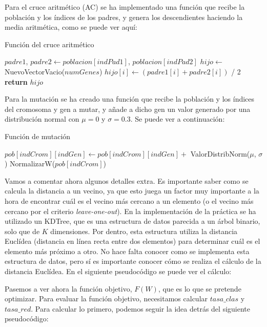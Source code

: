 \documentclass[11pt,a4paper]{article}
\begin{document}
Para el cruce aritmético (AC) se ha implementado una función que recibe la población y los índices de los padres, y genera
los descendientes haciendo la media aritmética, como se puede ver aquí:

\begin{algorithm}[H]
\caption{Función del cruce aritmético}
\begin{algorithmic}[1]
\State $padre1$, $padre2 \gets poblacion[indPad1]$, $poblacion[indPad2]$
\State $hijo \gets$ NuevoVectorVacio($numGenes$)
	\State $hijo[i] \gets (padre1[i] + padre2[i])$ / 2
\EndFor
\State \textbf{return} $hijo$
\EndFunction
\end{algorithmic}
\end{algorithm}

Para la mutación se ha creado una función que recibe la población y los índices del cromosoma y gen a mutar, y añade a dicho
gen un valor generado por una distribución normal con $\mu = 0$ y $\sigma = 0.3$. Se puede ver a continuación:

\begin{algorithm}[H]
\caption{Función de mutación}
\begin{algorithmic}[1]
\State $pob[indCrom][indGen] \gets pob[indCrom][indGen] + $ ValorDistribNorm($\mu$, $\sigma$)
\State NormalizarW($pob[indCrom]$)
\EndFunction
\end{algorithmic}
\end{algorithm}

Vamos a comentar ahora algunos detalles extra. Es importante saber como se calcula la distancia a un vecino, ya que esto juega
un factor muy importante a la hora de encontrar cuál es el vecino más cercano a un elemento (o el vecino más cercano por el
criterio \textit{leave-one-out}). En la implementación de la práctica se ha utilizado un KDTree, que es una estructura de datos
parecida a un árbol binario, solo que de $K$ dimensiones. Por dentro, esta estructura utiliza la distancia Euclídea (distancia
en línea recta entre dos elementos) para determinar cuál es el elemento más próximo a otro. No hace falta conocer como se
implementa esta estructura de datos, pero sí es importante conocer cómo se realiza el cálculo de la distancia Euclídea. En el
siguiente pseudocódigo se puede ver el cálculo:



Pasemos a ver ahora la función objetivo, $F(W)$, que es lo que se pretende optimizar. Para evaluar la función objetivo,
necesitamos calcular $tasa\_clas$ y $tasa\_red$. Para calcular lo primero, podemos seguir la idea detrás del siguiente
pseudocódigo:
\end{document}
